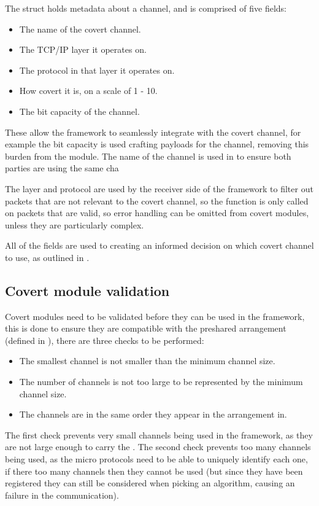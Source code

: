 The  struct holds metadata about a channel, and is comprised of five fields:
\begin{itemize}
    \item The name of the covert channel.
    \item The TCP/IP layer it operates on.
    \item The protocol in that layer it operates on.
    \item How covert it is, on a scale of 1 - 10.
    \item The bit capacity of the channel.
\end{itemize}
\label{itm:covert_method}

These allow the framework to seamlessly integrate with the covert channel, for example the bit capacity is used crafting payloads for the channel, removing this burden from the module. The name of the channel is used in  to ensure both parties are using the same cha

The layer and protocol are used by the receiver side of the framework to filter out packets that are not relevant to the covert channel, so the  function is only called on packets that are valid, so error handling can be omitted from covert modules, unless they are particularly complex.

All of the fields are used to creating an informed decision on which covert channel to use, as outlined in .

\subsection{Covert module validation}

Covert modules need to be validated before they can be used in the framework, this is done to ensure they are compatible with the preshared arrangement (defined in ), there are three checks to be performed:

\begin{itemize}
    \item The smallest channel is not smaller than the minimum channel size.
    \item The number of channels is not too large to be represented by the minimum channel size.
    \item The channels are in the same order they appear in the arrangement in.
\end{itemize}

The first check prevents very small channels being used in the framework, as they are not large enough to carry the . The second check prevents too many channels being used, as the micro protocols need to be able to uniquely identify each one, if there too many channels then they cannot be used (but since they have been registered they can still be considered when picking an algorithm, causing an failure in the communication).

